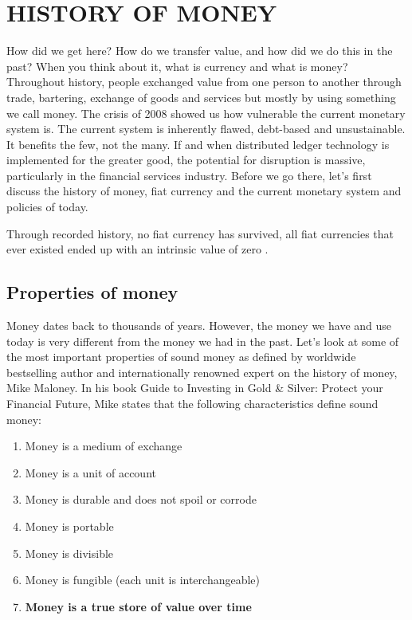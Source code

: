 \chapter{HISTORY OF MONEY}
\label{ch:historyofmoney}

How did we get here? How do we transfer value, and how did we do this in the past? When you think about it, what is currency and what is money? Throughout history, people exchanged value from one person to another through trade, bartering, exchange of goods and services but mostly by using something we call money. The crisis of 2008 showed us how vulnerable the current monetary system is. The current system is inherently flawed, debt-based and unsustainable. It benefits the few, not the many. If and when distributed ledger technology is implemented for the greater good, the potential for disruption is massive, particularly in the financial services industry. Before we go there, let's first discuss the history of money, fiat currency and the current monetary system and policies of today.

\bigskip
\bigskip
{}
    \begin{tcolorbox}
    [enhanced,
    title=All Fiat Currencies become Worthless,
    frame style=
    {left color=orange!85!black,right color=yellow!95!black}]
    
      
Through recorded history, no fiat currency has survived, all fiat currencies that ever  existed  ended up with an intrinsic value of zero 
 \parencite{thebigreset}.
\end{tcolorbox}
\bigskip

\section{Properties of money}
Money  dates back to thousands of years. However, the money we have and use today is very different from the money we  had in the past. Let's look at some of the most important properties of sound money as defined by  worldwide bestselling author and internationally renowned expert on the history of money, Mike Maloney. In his book Guide to Investing in Gold \& Silver: Protect your Financial Future, Mike states that the following characteristics define sound money:

\begin{enumerate}[label=(\alph*)]
    \setlength\itemsep{0em}
    \item Money is a medium of exchange
    \item Money is a unit of account
    \item Money is durable and does not spoil or corrode
    \item Money is portable
    \item Money is divisible
    \item Money is fungible (each unit is interchangeable)
    \item \textbf{Money is a true store of value over time}
\end{enumerate}

